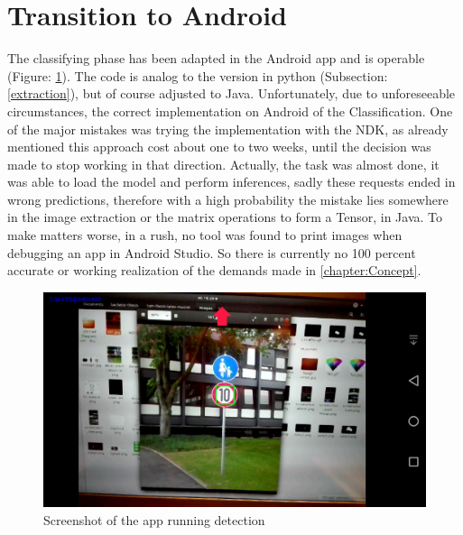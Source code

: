 \section{Transition to Android}
The classifying phase has been adapted in the Android app and is operable (Figure: \ref{fig:screenfun}). The code is analog to the version in python (Subsection: \ref{extraction}), but of course adjusted to Java. 
Unfortunately, due to unforeseeable circumstances, the correct implementation on Android of the Classification. One of the major mistakes was trying the implementation with the NDK, as already mentioned this approach cost about one to two weeks, until the decision was made to stop working in that direction. Actually, the task was almost done, it was able to load the model and perform inferences, sadly these requests ended in wrong predictions, therefore with a high probability the mistake lies somewhere in the image extraction or the matrix operations to form a Tensor, in Java. To make matters worse, in a rush, no tool was found to print images when debugging an app in Android Studio. So there is currently no 100 percent accurate or working realization of the demands made in \ref{chapter:Concept}. 
\newline

\begin{figure}[H]
	\centering
	\includegraphics[width=\linewidth]{images/screenshotfun.png}
	\caption{Screenshot of the app running detection}\label{fig:screenfun}
\end{figure}